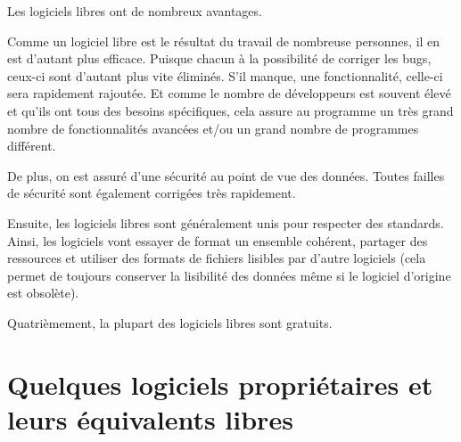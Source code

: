 Les logiciels libres ont de nombreux avantages.

Comme un logiciel libre est le résultat du travail de nombreuse personnes, il en est d'autant plus efficace. Puisque chacun à la possibilité de corriger les bugs, ceux-ci sont d'autant plus vite éliminés. S'il manque, une fonctionnalité, celle-ci sera rapidement rajoutée. Et comme le nombre de développeurs est souvent élevé et qu'ils ont tous des besoins spécifiques, cela assure au programme un très grand nombre de fonctionnalités avancées et/ou un grand nombre de programmes différent.

De plus, on est assuré d'une sécurité au point de vue des données. Toutes failles de sécurité sont également corrigées très rapidement.

Ensuite, les logiciels libres sont généralement unis pour respecter des standards. Ainsi, les logiciels vont essayer de format un ensemble cohérent, partager des ressources et utiliser des formats de fichiers lisibles par d'autre logiciels (cela permet de toujours conserver la lisibilité des données même si le logiciel d'origine est obsolète). %

Quatrièmement, la plupart des logiciels libres sont gratuits.

\section*{Quelques logiciels propriétaires et leurs équivalents libres}

